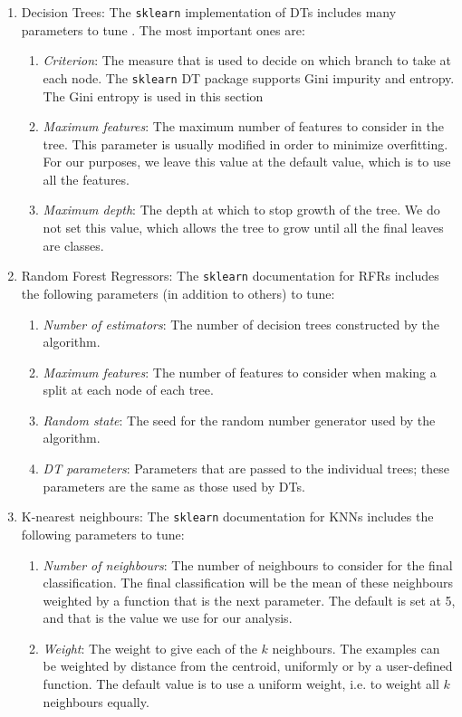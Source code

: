 \documentclass[11pt]{article}
\begin{document}
\begin{enumerate}
\item Decision Trees: The \texttt{sklearn} implementation of DTs includes many parameters to tune \cite{dt-documentation}. The most important ones are:

\begin{enumerate}
\item \textit{Criterion}: The measure that is used to decide on which branch to take at each node. The \texttt{sklearn} DT package supports Gini impurity and entropy. The Gini entropy is used in this section
\item \textit{Maximum features}: The maximum number of features to consider in the tree. This parameter is usually modified in order to minimize overfitting. For our purposes, we leave this value at the default value, which is to use all the features.
\item \textit{Maximum depth}: The depth at which to stop growth of the tree. We do not set this value, which allows the tree to grow until all the final leaves are classes.
\end{enumerate}

\item Random Forest Regressors: The \texttt{sklearn} documentation for RFRs \cite{rfr-documentation} includes the following parameters (in addition to others) to tune:
\begin{enumerate}
\item \textit{Number of estimators}: The number of decision trees constructed by the algorithm.
\item \textit{Maximum features}: The number of features to consider when making a split at each node of each tree.
\item \textit{Random state}: The seed for the random number generator used by the algorithm.
\item \textit{DT parameters}: Parameters that are passed to the individual trees; these parameters are the same as those used by DTs.
\end{enumerate}

\item K-nearest neighbours: The \texttt{sklearn} documentation for KNNs \cite{knn-documentation} includes the following parameters to tune:

\begin{enumerate}
\item \textit{Number of neighbours}: The number of neighbours to consider for the final classification. The final classification will be the mean of these neighbours weighted by a function that is the next parameter. The default is set at 5, and that is the value we use for our analysis.
\item \textit{Weight}: The weight to give each of the $k$ neighbours. The examples can be weighted by distance from the centroid, uniformly or by a user-defined function. The default value is to use a uniform weight, i.e. to weight all $k$ neighbours equally.
\end{enumerate}


\end{enumerate}
\end{document}
